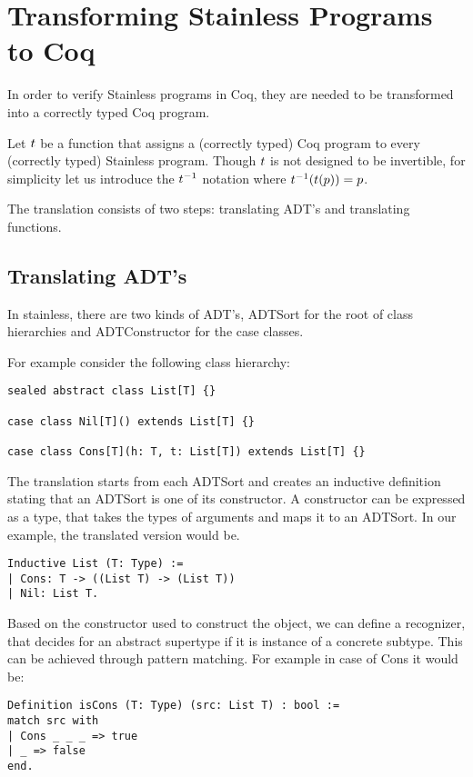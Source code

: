 \section{Transforming Stainless Programs to Coq}

In order to verify Stainless programs in Coq, they are needed to be transformed into a correctly typed Coq program.

\begin{definition}
	Let $t$ be a function that assigns a (correctly typed) Coq program to every (correctly typed) Stainless program. Though $t$ is not designed to be invertible, for simplicity let us introduce the $t^{-1}$ notation where $t^{-1}(t(p)) = p$.
\end{definition}

The translation consists of two steps: translating ADT's and translating functions.

\subsection{Translating ADT's}

In stainless, there are two kinds of ADT's, ADTSort for the root of class hierarchies and ADTConstructor for the case classes.

For example consider the following class hierarchy:

\begin{lstlisting}[style=myScalastyle]  
sealed abstract class List[T] {}

case class Nil[T]() extends List[T] {}

case class Cons[T](h: T, t: List[T]) extends List[T] {}
\end{lstlisting}

The translation starts from each ADTSort and creates an inductive definition stating that an ADTSort is one of its constructor. A constructor can be expressed as  a type, that takes the types of arguments and maps it to an ADTSort. In our example, the translated version would be.

\begin{lstlisting}[style=myCoqstyle]  
Inductive List (T: Type) :=
| Cons: T -> ((List T) -> (List T))
| Nil: List T.
\end{lstlisting}

Based on the constructor used to construct the object, we can define a recognizer, that decides for an abstract supertype if it is instance of a concrete subtype. This can be achieved through pattern matching. For example in case of Cons it would be:
\begin{lstlisting}[style=myCoqstyle]  
Definition isCons (T: Type) (src: List T) : bool :=
match src with
| Cons _ _ _ => true
| _ => false
end.
\end{lstlisting}


